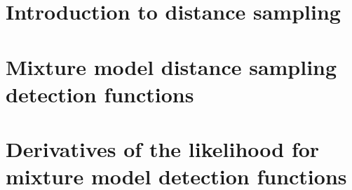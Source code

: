 \documentclass[12pt]{report}
\begin{document}
\chapter{Introduction to distance sampling}



\chapter{Mixture model distance sampling detection functions}



\appendix

%
%
%

\chapter{Derivatives of the likelihood for mixture model detection functions}






\end{document}

